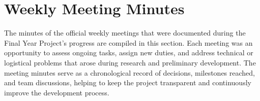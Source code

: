 \chapter{Weekly Meeting Minutes}
The minutes of the official weekly meetings that were documented during the Final Year Project's progress are compiled in this section. Each meeting was an opportunity to assess ongoing tasks, assign new duties, and address technical or logistical problems that arose during research and preliminary development. The meeting minutes serve as a chronological record of decisions, milestones reached, and team discussions, helping to keep the project transparent and continuously improve the development process.

















